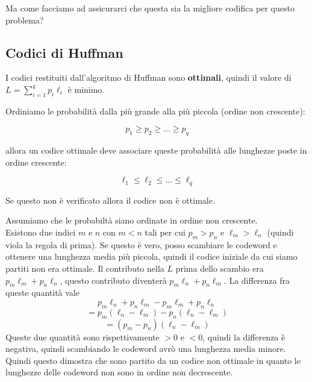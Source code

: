 Ma come facciamo ad assicurarci che questa sia la migliore codifica per questo problema?

\subsection*{Codici di Huffman}

I codici restituiti dall'algoritmo di Huffman sono \textbf{ottimali}, quindi il valore di $L=\sum_{i=1}^qp_i\ell_i$ è minimo.

Ordiniamo le probabilità dalla più grande alla più piccola (ordine non crescente):

\begin{equation*}
p_1 \geq p_2 \geq ... \geq p_q
\end{equation*}

allora un codice ottimale deve associare queste probabilità alle lunghezze poste in ordine crescente:

\begin{equation*}
\ell_1 \leq \ell_2 \leq ... \leq \ell_q
\end{equation*}

Se questo non è verificato allora il codice non è ottimale.

\begin{dimostrazione}
Assumiamo che le probabiltà siano ordinate in ordine non crescente.\\
Esistono due indici $m$ e $n$ con $m<n$ tali per cui $p_m > p_n$ e $\ell_m > \ell_n$ (quindi viola la regola di prima).
Se questo è vero, posso scambiare le codeword e ottenere una lunghezza media più piccola, quindi il codice iniziale da cui siamo partiti non era ottimale.
Il contributo nella $L$ prima dello scambio era $p_m\ell_m + p_n\ell_n$, questo contributo diventerà $p_m\ell_n+p_n\ell_m$.
La differenza fra queste quantità vale
\begin{equation*}
p_m\ell_n+p_n\ell_m-p_m\ell_m+p_n\ell_n
\end{equation*}
\begin{equation*}
= p_m(\ell_n-\ell_m)-p_n(\ell_n-\ell_m)
\end{equation*}
\begin{equation*}
= (p_m-p_n)(\ell_n-\ell_m)
\end{equation*}
Queste due quantità sono rispettivamente $>0$ e $<0$, quindi la differenza è negativa, quindi scambiando le codeword avrò una lunghezza media minore.
Quindi questo dimostra che sono partito da un codice non ottimale in quanto le lunghezze delle codeword non sono in ordine non decrescente.
\end{dimostrazione}

